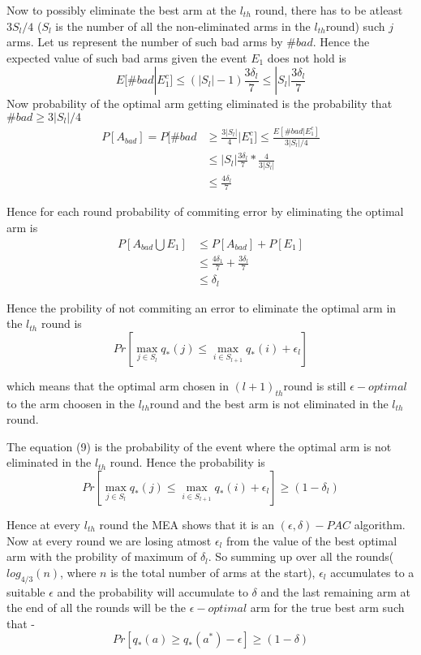 \documentclass[english]{article}
\begin{document}
Now to possibly eliminate the best arm at the $l_{th}$ round, there
has to be atleast $3S_{l}/4$ ($S_{l}$ is the number of all the non-eliminated
arms in the $l_{th}$round) such $j$ arms. Let us represent the number
of such bad arms by $\#bad$. Hence the expected value of such bad
arms given the event $E_{1}$ does not hold is
\[
E[\#bad|E_{1}^{c}]\leq(|S_{l}|-1)\frac{3\delta_{l}}{7}\leq|S_{l}|\frac{3\delta_{l}}{7}
\]
Now probability of the optimal arm getting eliminated is the probability
that $\#bad\geq3|S_{l}|/4$ 
\begin{align}
P[A_{bad}]=P[\#bad & \geq\frac{3|S_{l}|}{4}|E_{1}^{c}]\leq\frac{E[\#bad|E_{1}^{c}]}{3|S_{l}|/4}\label{Using Markov Inequaity}\\
 & \leq|S_{l}|\frac{3\delta_{l}}{7}*\frac{4}{3|S_{l}|}\\
 & \leq\frac{4\delta_{l}}{7}
\end{align}

Hence for each round probability of commiting error by eliminating
the optimal arm is 
\begin{align*}
P[A_{bad}\bigcup E_{1}] & \leq P[A_{bad}]+P[E_{1}]\\
 & \leq\frac{4\delta_{1}}{7}+\frac{3\delta_{l}}{7}\\
 & \leq\delta_{l}
\end{align*}

Hence the probility of not commiting an error to eliminate the optimal
arm in the $l_{th}$ round is
\begin{equation}
Pr[\max_{j\in S_{l}}q_{*}(j)\leq\max_{i\in S_{l+1}}q_{*}(i)+\epsilon_{l}]
\end{equation}

which means that the optimal arm chosen in $(l+1)_{th}$round is still
$\epsilon-optimal$ to the arm choosen in the $l_{th}$round and the
best arm is not eliminated in the $l_{th}$ round.

The equation (9) is the probability of the event where the optimal
arm is not eliminated in the $l_{th}$ round. Hence the probability
is
\[
Pr[\max_{j\in S_{l}}q_{*}(j)\leq\max_{i\in S_{l+1}}q_{*}(i)+\epsilon_{l}]\geq(1-\delta_{l})
\]

Hence at every $l_{th}$ round the MEA shows that it is an $(\epsilon,\delta)-PAC$
algorithm. Now at every round we are losing atmost $\epsilon_{l}$
from the value of the best optimal arm with the probility of maximum
of $\delta_{l}$. So summing up over all the rounds( $log_{4/3}(n)$,
where $n$ is the total number of arms at the start), $\epsilon_{l}$
accumulates to a suitable $\epsilon$ and the probability will accumulate
to $\delta$ and the last remaining arm at the end of all the rounds
will be the $\epsilon-optimal$ arm for the true best arm such that
-
\[
Pr[q_{*}(a)\geq q_{*}(a^{*})-\epsilon]\geq(1-\delta)
\]
\end{document}

